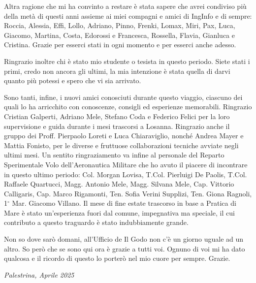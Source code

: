 Altra ragione che mi ha convinto a restare è stata sapere che avrei condiviso più della metà di questi anni assieme ai miei compagni e amici di IngInfo e di sempre: Roccia, Alessia, Effi, Lollo, Adriano, Pinno, Frenki, Lomax, Miri, Pax, Luca, Giacomo, Martina, Costa, Edorossi e Francesca, Rossella, Flavia, Gianluca e Cristina. Grazie per esserci stati in ogni momento e per esserci anche adesso.

Ringrazio inoltre chi è stato mio studente o tesista in questo periodo. Siete stati i primi, credo non ancora gli ultimi, la mia intenzione è stata quella di darvi quanto più potessi e spero che vi sia arrivato.

Sono tanti, infine, i nuovi amici conosciuti durante questo viaggio, ciascuno dei quali lo ha arricchito con conoscenze, consigli ed esperienze memorabili. Ringrazio Cristian Galperti, Adriano Mele, Stefano Coda e Federico Felici per la loro supervisione e guida durante i mesi trascorsi a Losanna. Ringrazio anche il gruppo dei Proff. Pierpaolo Loreti e Luca Chiaraviglio, nonché Andrea Mayer e Mattia Fonisto, per le diverse e fruttuose collaborazioni tecniche avviate negli ultimi mesi. Un sentito ringraziamento va infine al personale del Reparto Sperimentale Volo dell'Aeronautica Militare che ho avuto il piacere di incontrare in questo ultimo periodo: Col. Morgan Lovisa, T.Col. Pierluigi De Paolis, T.Col. Raffaele Quartucci, Magg. Antonio Mele, Magg. Silvana Mele, Cap. Vittorio Calligaris, Cap. Marco Rigamonti, Ten. Sofia Verini Supplizi, Ten. Giona Ragnoli, 1$^{\circ}$ Mar. Giacomo Villano. Il mese di fine estate trascorso in base a Pratica di Mare è stato un'esperienza fuori dal comune, impegnativa ma speciale, il cui contributo a questo traguardo è stato indubbiamente grande.

Non so dove sarò domani, all'Ufficio de Il Godo non c'è un giorno uguale ad un altro. So però che se sono qui ora è grazie a tutti voi. Ognuno di voi mi ha dato qualcosa e il ricordo di questo lo porterò nel mio cuore per sempre. Grazie.

\bigskip

\noindent\textit{Palestrina, Aprile 2025}

\bigskip

